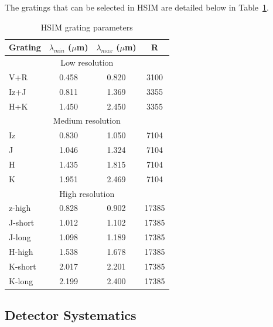 \documentclass[12pt]{report}
\begin{document}
The gratings that can be selected in HSIM are detailed below in Table~\ref{tab:gratings}.
\begin{table}[h]
\centering
\caption{HSIM grating parameters}
\label{tab:gratings}
\begin{tabular}{lccc}
\hline
Grating & $\lambda_{min}$ ($\mu$m) & $\lambda_{max}$ ($\mu$m) & R \\
\hline
\multicolumn{4}{c}{Low resolution}\\
\hline
V+R & 0.458 & 0.820 & 3100 \\
Iz+J & 0.811 & 1.369 & 3355 \\
H+K & 1.450 & 2.450 & 3355 \\
\hline
\multicolumn{4}{c}{Medium resolution}\\
\hline
Iz & 0.830 & 1.050 & 7104 \\
J & 1.046 & 1.324 & 7104 \\
H & 1.435 & 1.815 & 7104 \\
K & 1.951 & 2.469 & 7104\\
\hline
\multicolumn{4}{c}{High resolution}\\
\hline
z-high & 0.828 & 0.902 & 17385 \\
J-short & 1.012 & 1.102 & 17385 \\
J-long & 1.098 & 1.189 & 17385 \\
H-high & 1.538 & 1.678 & 17385 \\
K-short & 2.017 & 2.201 & 17385 \\
K-long & 2.199 & 2.400 & 17385 \\
\hline
\end{tabular}
\end{table}

\subsection{Detector Systematics}
\end{document}
